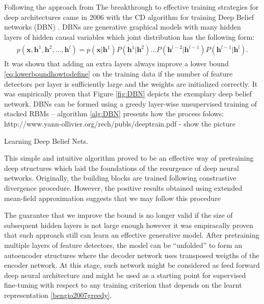 \documentclass[../report/report.tex]{subfiles}
\begin{document}
Following the approach from 
The breakthrough to effective training strategies for deep architectures came in 2006 with the CD algorithm for training
Deep Belief networks (DBN) \cite{hinton2006reducing}. DBNs are generative graphical models with many hidden layers of hidden
causal variables which joint distribution has the following form:
\begin{align}
\begin{split}
p(\mathbf{x}, \mathbf{h}^1, \mathbf{h}^2,..., \mathbf{h}^l) = p(\mathbf{x}| \mathbf{h}^1)P(\mathbf{h}^1|\mathbf{h}^2)...
P(\mathbf{h}^{l-2}|\mathbf{h}^{l-1})P(\mathbf{h}^{l-1}|\mathbf{h}^{l}).
\end{split}
\end{align}
It was shown that adding an extra layers always improve a lower bound \ref{eq:lowerboundhowtodefine} on the training data
if the number of feature detectors per layer is sufficiently large and the weights are initialized correctly. It was empirically
proven that Figure \ref{fig:DBN} depicts the exemplary deep belief network.
DBNs can be formed using a greedy layer-wise unsupervised training of stacked RBMs -- algorithm \ref{alg:DBN} presents how the process
folows:
http://www.yann-ollivier.org/rech/publs/deeptrain.pdf - show the picture 
\begin{algorithm}[!bthp]
\caption{Learning Deep Belief Nets.}
\label{alg:DBN}
\begin{algorithmic}
\EndFor
\end{algorithmic}
\end{algorithm}
This simple and intuitive algorithm proved to be an effective way of pretraining deep structures which laid the foundations
of the resurgence of deep neural networks. Originally, the building blocks are trained following constrastive divergence 
procedure.  However, the positive results obtained using extended mean-field approximation 
suggests that we may 
follow this procedure 

 The guarantee that we improve the bound is no longer valid if the size of subsequent hidden layers is not large enough
 however it was empiracally proven that such approach still can learn an effective generative model. After pretraining multiple layers of feature detectors, the model can be ``unfolded'' to form an autoencoder structures 
where the decoder network uses transposed weigths of the encoder network. At this stage, such network might be considered
as feed forward deep neural architecture and might be used as a starting point for supervised fine-tuning with respect to any
training criterion that depends on the learnt representation \ref{bengio2007greedy}. 
\end{document}
